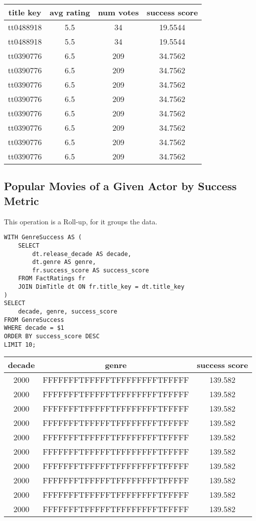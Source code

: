 \documentclass[sigconf, pbalance]{acmart}
\begin{document}
\begin{center}
\begin{tabular}{|c|c|c|c|}
\hline
title key & avg rating & num votes & success score \\
\hline
tt0488918 & 5.5 & 34 & 19.5544 \\
tt0488918 & 5.5 & 34 & 19.5544 \\
tt0390776 & 6.5 & 209 & 34.7562 \\
tt0390776 & 6.5 & 209 & 34.7562 \\
tt0390776 & 6.5 & 209 & 34.7562 \\
tt0390776 & 6.5 & 209 & 34.7562 \\
tt0390776 & 6.5 & 209 & 34.7562 \\
tt0390776 & 6.5 & 209 & 34.7562 \\ 
tt0390776 & 6.5 & 209 & 34.7562 \\ 
tt0390776 & 6.5 & 209 & 34.7562 \\
\hline
\end{tabular}
\end{center}


\subsection{Popular Movies of a Given Actor by Success Metric}

This operation is a Roll-up, for it groups the data.

\begin{lstlisting}[style=SQLStyle]
WITH GenreSuccess AS (
    SELECT
        dt.release_decade AS decade,
        dt.genre AS genre,
        fr.success_score AS success_score
    FROM FactRatings fr
    JOIN DimTitle dt ON fr.title_key = dt.title_key
)
SELECT
    decade, genre, success_score
FROM GenreSuccess
WHERE decade = $1
ORDER BY success_score DESC
LIMIT 10;
\end{lstlisting}

\begin{center}
\begin{tabular}{|c|c|c|}
\hline
decade & genre & success score \\
\hline
2000 & FFFFFFFTFFFFFTFFFFFFFFTFFFFF & 139.582 \\
2000 & FFFFFFFTFFFFFTFFFFFFFFTFFFFF & 139.582 \\ 
2000 & FFFFFFFTFFFFFTFFFFFFFFTFFFFF & 139.582 \\ 
2000 & FFFFFFFTFFFFFTFFFFFFFFTFFFFF & 139.582 \\ 
2000 & FFFFFFFTFFFFFTFFFFFFFFTFFFFF & 139.582 \\ 
2000 & FFFFFFFTFFFFFTFFFFFFFFTFFFFF & 139.582 \\ 
2000 & FFFFFFFTFFFFFTFFFFFFFFTFFFFF & 139.582 \\ 
2000 & FFFFFFFTFFFFFTFFFFFFFFTFFFFF & 139.582 \\ 
2000 & FFFFFFFTFFFFFTFFFFFFFFTFFFFF & 139.582 \\ 
2000 & FFFFFFFTFFFFFTFFFFFFFFTFFFFF & 139.582 \\ 
\hline
\end{tabular}
\end{center}
\end{document}
